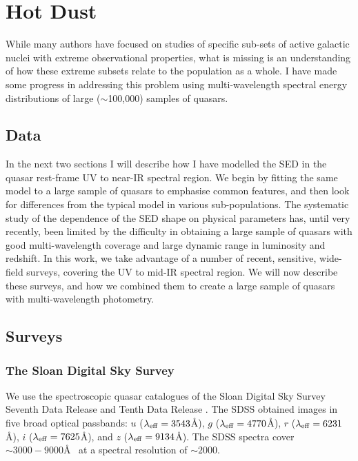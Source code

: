 \chapter{Hot Dust}\label{ch:hotdust} 





While many authors have focused on studies of specific sub-sets of active galactic nuclei with extreme observational properties, what is missing is an understanding of how these extreme subsets relate to the population as a whole. 
I have made some progress in addressing this problem using multi-wavelength spectral energy distributions of large ($\sim$100,000) samples of quasars. 

\section{Data}

In the next two sections I will describe how I have modelled the SED in the quasar rest-frame UV to near-IR spectral region. 
We begin by fitting the same model to a large sample of quasars to emphasise common features, and then look for differences from the typical model in various sub-populations. 
The systematic study of the dependence of the SED shape on physical parameters has, until very recently, been limited by the difficulty in obtaining a large sample of quasars with good multi-wavelength coverage and large dynamic range in luminosity and redshift. 
In this work, we take advantage of a number of recent, sensitive, wide-field surveys, covering the UV to mid-IR spectral region. 
We will now describe these surveys, and how we combined them to create a large sample of quasars with multi-wavelength photometry.        

\section{Surveys}

\subsection{The Sloan Digital Sky Survey}

We use the spectroscopic quasar catalogues of the Sloan Digital Sky Survey \citep[SDSS;][]{york00} Seventh Data Release \citep[DR7Q;][]{schneider10} and Tenth Data Release \citep[DR10Q;][]{paris14}. 
The SDSS obtained images in five broad optical passbands: $u$ ($\lambda_{\rm eff} = 3543$\AA), $g$ ($\lambda_{\rm eff} = 4770$\AA), $r$ ($\lambda_{\rm eff} = 6231$\AA), $i$ ($\lambda_{\rm eff} = 7625$\AA), and $z$ ($\lambda_{\rm eff} = 9134$\AA). 
The SDSS spectra cover $\sim 3000 - 9000$\AA~ at a spectral resolution of $\sim 2000$. 

